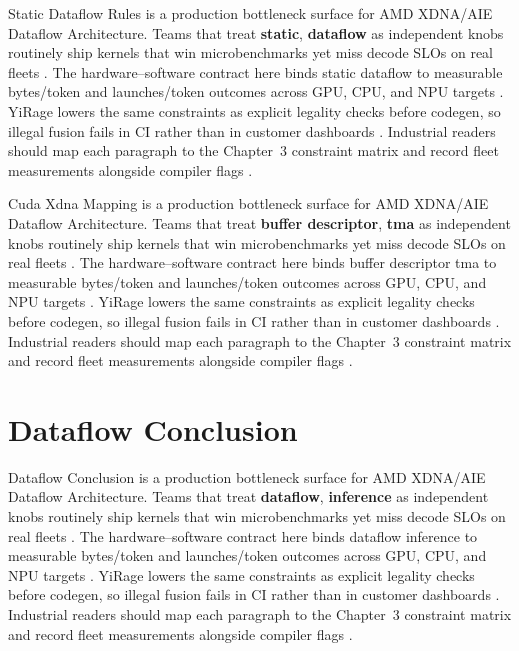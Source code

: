 Static Dataflow Rules is a production bottleneck surface for AMD XDNA/AIE Dataflow Architecture. Teams that treat \textbf{static}, \textbf{dataflow} as independent knobs routinely ship kernels that win microbenchmarks yet miss decode SLOs on real fleets \citep{nvidia2022hopper,amd2024aie}. The hardware--software contract here binds static dataflow to measurable bytes/token and launches/token outcomes across GPU, CPU, and NPU targets \citep{semianalysis2024tma,dlbook}. YiRage lowers the same constraints as explicit legality checks before codegen, so illegal fusion fails in CI rather than in customer dashboards \citep{amd2024xdna,dao2022flashattention}. Industrial readers should map each paragraph to the Chapter~3 constraint matrix and record fleet measurements alongside compiler flags \citep{amd2024aie,kwon2023vllm}.

Cuda Xdna Mapping is a production bottleneck surface for AMD XDNA/AIE Dataflow Architecture. Teams that treat \textbf{buffer descriptor}, \textbf{tma} as independent knobs routinely ship kernels that win microbenchmarks yet miss decode SLOs on real fleets \citep{semianalysis2024tma,dlbook}. The hardware--software contract here binds buffer descriptor tma to measurable bytes/token and launches/token outcomes across GPU, CPU, and NPU targets \citep{amd2024xdna,dao2022flashattention}. YiRage lowers the same constraints as explicit legality checks before codegen, so illegal fusion fails in CI rather than in customer dashboards \citep{amd2024aie,kwon2023vllm}. Industrial readers should map each paragraph to the Chapter~3 constraint matrix and record fleet measurements alongside compiler flags \citep{dlbook,nvidia2024cudagraphs}.

\section{Dataflow Conclusion}
\label{sec:dataflow_conclusion}

Dataflow Conclusion is a production bottleneck surface for AMD XDNA/AIE Dataflow Architecture. Teams that treat \textbf{dataflow}, \textbf{inference} as independent knobs routinely ship kernels that win microbenchmarks yet miss decode SLOs on real fleets \citep{amd2024xdna,dao2022flashattention}. The hardware--software contract here binds dataflow inference to measurable bytes/token and launches/token outcomes across GPU, CPU, and NPU targets \citep{amd2024aie,kwon2023vllm}. YiRage lowers the same constraints as explicit legality checks before codegen, so illegal fusion fails in CI rather than in customer dashboards \citep{dlbook,nvidia2024cudagraphs}. Industrial readers should map each paragraph to the Chapter~3 constraint matrix and record fleet measurements alongside compiler flags \citep{dao2022flashattention,liu2024deepseekv3}.

